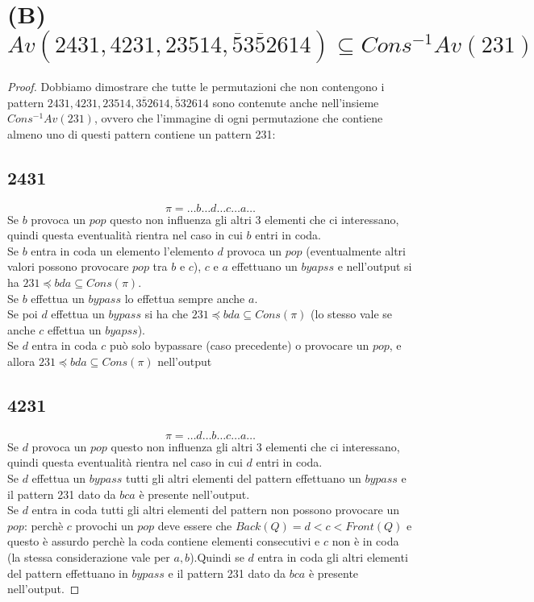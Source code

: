 \documentclass[10pt,a4paper]{article}
\begin{document}
\section*{(B) $Av(2431, 4231, 23514, \overline{5}3\overline{5}2614) \subseteq Cons^{-1}Av(231)$}
\begin{proof}
Dobbiamo dimostrare che tutte le permutazioni che non contengono i pattern $2431, 4231, 23514, 3\overline{5}2614, \overline{5}32614$ sono contenute anche nell'insieme \\$Cons^{-1}Av(231)$, ovvero che l'immagine di ogni permutazione che contiene almeno uno di questi pattern contiene un pattern 231:
\subsection*{2431}
$$\pi = \dots{b}\dots{d}\dots{c}\dots{a}\dots$$
Se $b$ provoca un $pop$ questo non influenza gli altri 3 elementi che ci interessano, quindi questa eventualità rientra nel caso in cui $b$ entri in coda.\\Se $b$ entra in coda un elemento l'elemento $d$ provoca un $pop$ (eventualmente altri valori possono provocare $pop$ tra $b$ e $c$), $c$ e $a$ effettuano un $byapss$ e nell'output si ha $231\preceq{bda}\subseteq{Cons(\pi)}$.\\
Se $b$ effettua un $bypass$ lo effettua sempre anche $a$.\\
Se poi $d$ effettua un $bypass$ si ha che $231\preceq{bda}\subseteq{Cons(\pi)}$ (lo stesso vale se anche $c$ effettua un $byapss$).\\
Se $d$ entra in coda $c$ può solo bypassare (caso precedente) o provocare un $pop$, e allora $231\preceq{bda}\subseteq{Cons(\pi)}$ nell'output
\subsection*{4231}
$$\pi = \dots{d}\dots{b}\dots{c}\dots{a}\dots$$
Se $d$ provoca un $pop$ questo non influenza gli altri 3 elementi che ci interessano, quindi questa eventualità rientra nel caso in cui $d$ entri in coda.\\
Se $d$ effettua un $bypass$ tutti gli altri elementi del pattern effettuano un $bypass$ e il pattern 231 dato da $bca$ è presente nell'output.\\
Se $d$ entra in coda tutti gli altri elementi del pattern non possono provocare un $pop$: perchè $c$ provochi un $pop$ deve essere che $Back(Q)=d<c<Front(Q)$ e questo è assurdo perchè la coda contiene elementi consecutivi e $c$ non è in coda (la stessa considerazione vale per $a,b$).Quindi se $d$ entra in coda gli altri elementi del pattern effettuano in $bypass$ e il pattern 231 dato da $bca$ è presente nell'output.

\end{proof}
\end{document}
